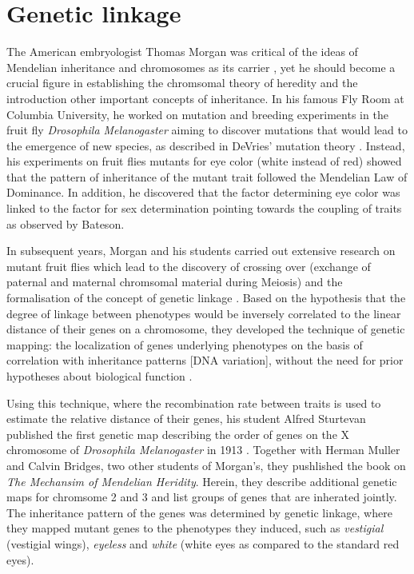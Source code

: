 \section{Genetic linkage}
The American embryologist Thomas Morgan was critical of the ideas of Mendelian inheritance and chromosomes as its carrier \citep{Allen1968}, yet he should become a crucial figure in establishing the chromsomal theory of heredity and the introduction other important concepts of inheritance. In his famous Fly Room at Columbia University, he worked on mutation and breeding experiments in the fruit fly \textit{Drosophila Melanogaster} aiming to discover mutations that would lead to the emergence of new species, as described in DeVries' mutation theory \citep{Allen1968}. Instead, his experiments on fruit flies mutants for eye color (white instead of red) showed that the pattern of inheritance of the mutant trait followed the Mendelian Law of Dominance. In addition, he discovered that the factor determining eye color was linked to the factor for sex determination \citep{Morgan1910,Morgan1911a} pointing towards the coupling of traits as observed by Bateson.

In subsequent years, Morgan and his students carried out extensive research on mutant fruit flies which lead to the discovery of crossing over (exchange of paternal and maternal chromsomal material during Meiosis) and the formalisation of the concept of genetic linkage \citep{Morgan1911b}. Based on the hypothesis that the degree of linkage between phenotypes would be inversely correlated to the linear distance of their genes on a chromosome, they developed the technique of genetic mapping: the localization of genes underlying phenotypes on the basis of correlation with inheritance patterns [DNA variation], without the need for prior hypotheses about biological function \citep{Altshuler2008}.

Using this technique, where the recombination rate between traits is used to estimate the relative distance of their genes, his student Alfred Sturtevan published the first genetic map describing the order of genes on the X chromosome of \textit{Drosophila Melanogaster} in 1913 \citep{Sturtevan1913}. Together with Herman Muller and Calvin Bridges, two other students of Morgan's,  they pushlished the book on \textit{The Mechansim of Mendelian Heridity}\citep{Morgan2015}. Herein, they describe additional genetic maps for chromsome 2 and 3 and list groups of genes that are inherated jointly. The inheritance pattern of the genes was determined by genetic linkage, where they mapped mutant genes to the phenotypes they induced, such as \textit{vestigial} (vestigial wings), \textit{eyeless} and \textit{white} (white eyes as compared to the standard red eyes). 

